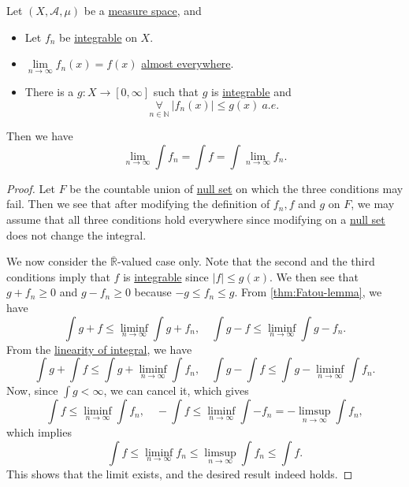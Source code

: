 \begin{theorem}\label{thm:dominated-convergence-theorem}
	Let \((X, \mathcal{A} , \mu )\) be a \hyperref[def:measure-space]{measure space}, and
	\begin{itemize}
		\item Let \(f_{n}\) be \hyperref[def:integrable]{integrable} on \(X\).
		\item \(\lim\limits_{n \to \infty} f_{n}(x) = f(x)\) \hyperref[def:mu-almost-everywhere]{almost everywhere}.
		\item There is a \(g\colon X\to [0, \infty ]\) such that \(g\) is \hyperref[def:integrable]{integrable} and
		      \[
			      \underset{n\in\mathbb{N} }{\forall }\ \left\vert f_{n}(x) \right\vert \leq g(x)\ \hyperref[def:mu-almost-everywhere]{a.e.}
		      \]
	\end{itemize}
	Then we have
	\[
		\lim\limits_{n \to \infty} \int f_{n} = \int f = \int \lim\limits_{n \to \infty} f_{n}.
	\]
\end{theorem}
\begin{proof}
	Let \(F\) be the countable union of \hyperref[def:mu-null-set]{null set} on which the three conditions may fail. Then we see that after modifying the definition of \(f_{n}, f\) and \(g\) on \(F\),
	we may assume that all three conditions hold everywhere since modifying on a \hyperref[def:mu-null-set]{null set} does not change the integral.

	\par We now consider the \(\overline{\mathbb{R} }\)-valued case only. Note that the second and the third conditions
	imply that \(f\) is \hyperref[def:integrable]{integrable} since \(\left\vert f \right\vert \leq g(x)\). We then see that \(g + f_{n}\geq 0\) and \(g - f_{n}\geq 0\) because \(-g\leq f_{n}\leq g\).
	From \autoref{thm:Fatou-lemma}, we have
	\[
		\int g + f \leq \liminf_{n \to \infty} \int g + f_{n},\quad \int g - f\leq \liminf_{n \to \infty} \int g - f_{n}.
	\]
	From the \hyperref[lma:linearity-of-integral]{linearity of integral}, we have
	\[
		\int g + \int f\leq \int g + \liminf_{n \to \infty} \int f_{n},\quad \int g - \int f \leq \int g - \liminf_{n \to \infty} \int f_{n}.
	\]
	Now, since \(\int g<\infty \), we can cancel it, which gives
	\[
		\int f \leq \liminf_{n \to \infty} \int f_{n},\quad -\int f \leq \liminf_{n \to \infty} \int -f_{n} = - \limsup_{n \to \infty} \int f_{n},
	\]
	which implies
	\[
		\int f \leq \liminf_{n \to \infty} f_{n}\leq \limsup_{n \to \infty} \int f_{n}\leq \int f.
	\]
	This shows that the limit exists, and the desired result indeed holds.
\end{proof}

